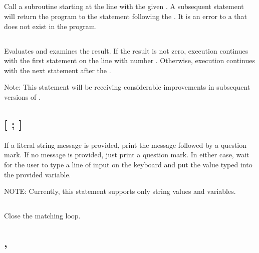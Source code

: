 \documentclass{report}
\begin{document}
    \subsection*{ }

    Call a subroutine starting at the line with the given .
    A subsequent  statement will return the program to the statement
    following the .
    It is an error to  a  that does not exist in the program.

    \subsection*{   }

    Evaluates  and examines the result.
    If the result is not zero, execution continues with the first statement on the line with number .
    Otherwise, execution continues with the next statement after the .

    Note: This statement will be receiving considerable improvements in subsequent versions of \BASIC.

    \subsection*{ [ ; ] }

    If a literal string message is provided, print the message followed by a question mark.
    If no message is provided, just print a question mark.
    In either case, wait for the user to type a line of input on the keyboard and
    put the value typed into the provided variable.

    NOTE: Currently, this statement supports only string values and variables.

    \subsection*{}

    Close the matching  loop.

    \subsection*{ , }
\end{document}
